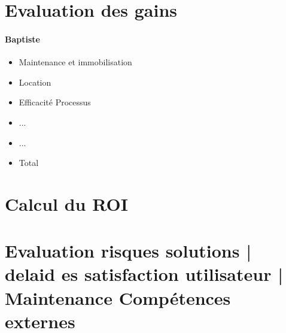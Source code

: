 \section{Evaluation des gains}

    \paragraph{Baptiste}
        \begin{itemize}
            \item Maintenance et immobilisation
            \item Location
            \item Efficacité Processus
            \item ...
            \item ...
            \item Total
        \end{itemize}
        
\section{Calcul du ROI}

\section{Evaluation risques solutions | delaid es satisfaction utilisateur | Maintenance Compétences externes}
